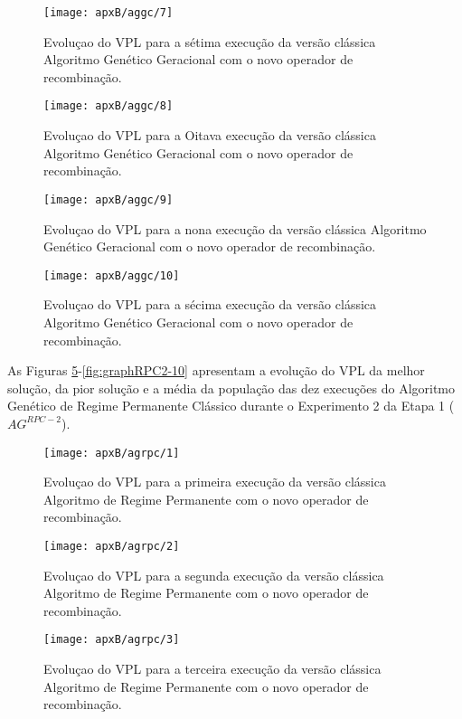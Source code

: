 \begin{figure}[H]
\centering
\texttt{[image: apxB/aggc/7]}
\caption{Evoluçao do VPL para a sétima execução da versão clássica Algoritmo Genético Geracional com o novo operador de recombinação.}
\label{fig:graphGC2-07}
\end{figure}

\begin{figure}[H]
\centering
\texttt{[image: apxB/aggc/8]}
\caption{Evoluçao do VPL para a Oitava execução da versão clássica Algoritmo Genético Geracional com o novo operador de recombinação.}
\label{fig:graphGC2-08}
\end{figure}

\begin{figure}[H]
\centering
\texttt{[image: apxB/aggc/9]}
\caption{Evoluçao do VPL para a nona execução da versão clássica Algoritmo Genético Geracional com o novo operador de recombinação.}
\label{fig:graphGC2-09}
\end{figure}

\begin{figure}[H]
\centering
\texttt{[image: apxB/aggc/10]}
\caption{Evoluçao do VPL para a sécima execução da versão clássica Algoritmo Genético Geracional com o novo operador de recombinação.}
\label{fig:graphGC2-10}
\end{figure}

As Figuras \ref{fig:graphRPC2-01}-\ref{fig:graphRPC2-10} apresentam a evolução do VPL da melhor solução, da pior solução e a média da população das dez execuções do Algoritmo Genético de Regime Permanente Clássico durante o Experimento 2 da Etapa 1 ($AG^{RPC-2}$).

\begin{figure}[H]
\centering
\texttt{[image: apxB/agrpc/1]}
\caption{Evoluçao do VPL para a primeira execução da versão clássica Algoritmo de Regime Permanente com o novo operador de recombinação.}
\label{fig:graphRPC2-01}
\end{figure}

\begin{figure}[H]
\centering
\texttt{[image: apxB/agrpc/2]}
\caption{Evoluçao do VPL para a segunda execução da versão clássica Algoritmo de Regime Permanente com o novo operador de recombinação.}
\label{fig:graphRPC2-02}
\end{figure}

\begin{figure}[H]
\centering
\texttt{[image: apxB/agrpc/3]}
\caption{Evoluçao do VPL para a terceira execução da versão clássica Algoritmo de Regime Permanente com o novo operador de recombinação.}
\label{fig:graphRPC2-03}
\end{figure}

